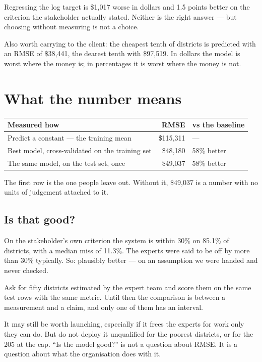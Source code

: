\documentclass[11pt,a4paper]{article}
\begin{document}
Regressing the log target is \$1{,}017 worse in dollars and 1.5 points better
on the criterion the stakeholder actually stated. Neither is the right answer
--- but choosing without measuring is not a choice.

Also worth carrying to the client: the cheapest tenth of districts is predicted
with an RMSE of \$38{,}441, the dearest tenth with \$97{,}519. In dollars the
model is worst where the money is; in percentages it is worst where the money
is not.

\section{What the number means}

\begin{center}
\small
\begin{tabular}{lrl}
\toprule
\textbf{Measured how} & \textbf{RMSE} & \textbf{vs the baseline} \\
\midrule
Predict a constant --- the training mean & \$115{,}311 & --- \\
Best model, cross-validated on the training set & \$48{,}180 & 58\% better \\
The same model, on the test set, once & \$49{,}037 & 58\% better \\
\bottomrule
\end{tabular}
\end{center}

The first row is the one people leave out. Without it, \$49{,}037 is a number
with no units of judgement attached to it.

\subsection{Is that good?}

On the stakeholder's own criterion the system is within 30\% on 85.1\% of
districts, with a median miss of 11.3\%. The experts were said to be off by
more than 30\% typically. So: plausibly better --- on an assumption we were
handed and never checked.

\begin{keybox}[title={What a defensible report says}]
Ask for fifty districts estimated by the expert team and score them on the same
test rows with the same metric. Until then the comparison is between a
measurement and a claim, and only one of them has an interval.

It may still be worth launching, especially if it frees the experts for work
only they can do. But do not deploy it unqualified for the poorest districts,
or for the 205 at the cap. ``Is the model good?'' is not a question about RMSE.
It is a question about what the organisation does with it.
\end{keybox}
\end{document}
